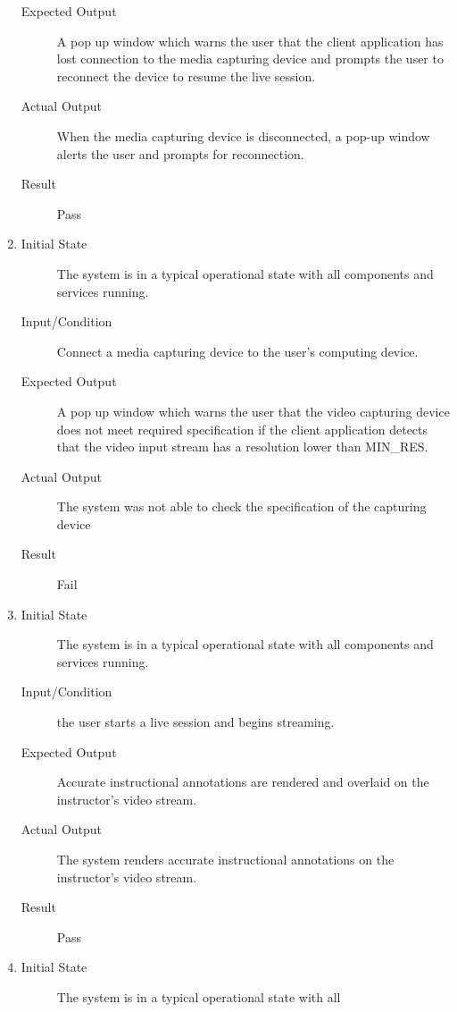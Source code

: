 \documentclass[12pt, titlepage]{article}
\begin{document}
\begin{enumerate}[NFR-T1]
\begin{description}
    \item[Expected Output] A pop up window which warns the user that the client
      application has lost connection to the media capturing device and prompts
      the user to reconnect the device to resume the live session.
    \item[Actual Output] When the media capturing device is disconnected, a pop-up 
    window alerts the user and prompts for reconnection.
    \item[Result] Pass 
    \end{description}
  \item \label{NFRT11}
    \begin{description}
    \item[Initial State] The system is in a typical operational state with all
      components and services running.
    \item[Input/Condition] Connect a media capturing device to the user’s computing
      device.
    \item[Expected Output] A pop up window which warns the user that the video
      capturing device does not meet required specification if the client
      application detects that the video input stream has a resolution lower than
      MIN\_RES.
    \item[Actual Output] The system was not able to check the specification of the capturing 
    device
    \item[Result] Fail 
    \end{description}
  \item \label{NFRT12}
    \begin{description}
    \item[Initial State] The system is in a typical operational state with all
      components and services running.
    \item[Input/Condition] the user starts a live session and begins streaming.
    \item[Expected Output] Accurate instructional annotations are rendered and
      overlaid on the instructor’s video stream.
    \item[Actual Output] The system renders accurate instructional annotations on 
    the instructor’s video stream.
    \item[Result] Pass 
    \end{description}
  \item \label{NFRT13}
    \begin{description}
    \item[Initial State] The system is in a typical operational state with all

\end{description}
\end{enumerate}
\end{document}
